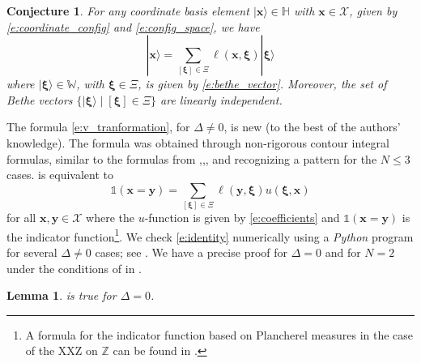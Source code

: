 \documentclass[a4paper,11pt]{article}
\newtheorem{lemma}[theorem]{Lemma}
\newtheorem{conjecture}[theorem]{Conjecture}
\theoremstyle{definition}
\begin{document}
\begin{conjecture}\label{c:main_v3}
For any coordinate basis element $|\mathbf{x}\rangle \in \mathbb{H}$ with $\mathbf{x} \in \mathcal{X}$, given by \eqref{e:coordinate_config} and \eqref{e:config_space}, we have
    \begin{equation}\label{e:v_tranformation}
    | \mathbf{x} \rangle = \sum_{[\boldsymbol{\xi}] \in \Xi} \ell(\mathbf{x}, \boldsymbol{\xi}) | \boldsymbol{\xi} \rangle
    \end{equation}
where $|\boldsymbol{\xi} \rangle \in \mathbb{W}$, with $\boldsymbol{\xi} \in \Xi$, is given by \eqref{e:bethe_vector}. Moreover, the set of Bethe vectors $\{|\boldsymbol{\xi} \rangle \mid [\boldsymbol{\xi}] \in \Xi \}$ are linearly independent.
\end{conjecture}

The formula \eqref{e:v_tranformation}, for $\Delta \neq 0$, is new (to the best of the authors' knowledge). The formula was obtained through non-rigorous contour integral formulas, similar to the formulas from \cite{tracy_asymptotics_2009},\cite{liu_integral_2020},\cite{li_contour_2023}, and recognizing a pattern for the $N \leq 3$ cases.  is equivalent to 
\begin{equation}\label{e:identity}
    \mathds{1}(\mathbf{x} = \mathbf{y}) = \sum_{[\boldsymbol{\xi}] \in \Xi}  \ell(\mathbf{y}, \boldsymbol{\xi}) u(\boldsymbol{\xi}, \mathbf{x})
\end{equation}
for all $\mathbf{x}, \mathbf{y} \in \mathcal{X}$ where the $u$-function is given by \eqref{e:coefficients} and $\mathds{1}(\mathbf{x} = \mathbf{y})$ is the indicator function\footnote{A formula for the indicator function based on Plancherel measures in the case of the XXZ on $\mathbb{Z}$ can be found in \cite{Gutkin2000-gr}.}. We check \eqref{e:identity} numerically using a \emph{Python} program for several $\Delta \neq 0$ cases; see . We have a precise proof for $\Delta =0$ and for $N=2$ under the conditions of  in .

\begin{lemma}\label{l:main_v3}
 is true for $\Delta =0$.
\end{lemma}
\end{document}
